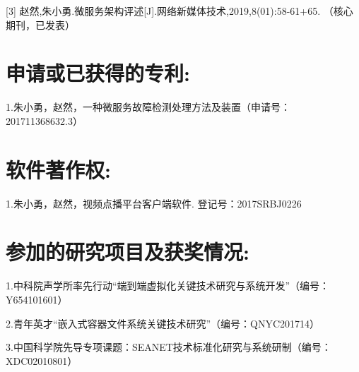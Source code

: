 [3] 赵然,朱小勇.微服务架构评述[J].网络新媒体技术,2019,8(01):58-61+65. （核心期刊，已发表）

\section*{申请或已获得的专利:}

1.朱小勇，赵然，一种微服务故障检测处理方法及装置（申请号： 201711368632.3）

\section*{软件著作权:}

1.朱小勇，赵然，视频点播平台客户端软件. 登记号：2017SRBJ0226

\section*{参加的研究项目及获奖情况:}

1.中科院声学所率先行动“端到端虚拟化关键技术研究与系统开发”（编号： Y654101601）

2.青年英才“嵌入式容器文件系统关键技术研究”（编号：QNYC201714）

3.中国科学院先导专项课题：SEANET技术标准化研究与系统研制（编号：XDC02010801） 


\cleardoublepage[plain]%

